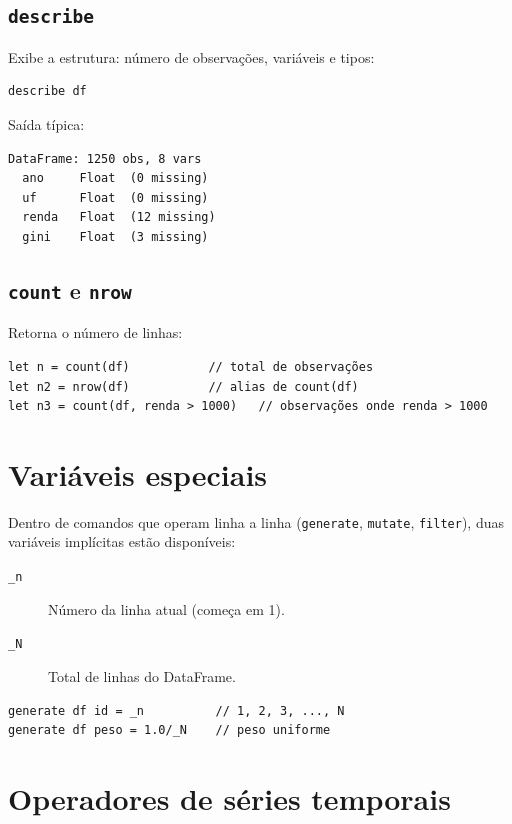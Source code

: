 \subsection*{\texttt{describe}}

Exibe a estrutura: número de observações, variáveis e tipos:

\begin{lstlisting}
describe df
\end{lstlisting}

Saída típica:

\begin{lstlisting}[style=inline]
DataFrame: 1250 obs, 8 vars
  ano     Float  (0 missing)
  uf      Float  (0 missing)
  renda   Float  (12 missing)
  gini    Float  (3 missing)
\end{lstlisting}

\subsection*{\texttt{count} e \texttt{nrow}}

Retorna o número de linhas:

\begin{lstlisting}
let n = count(df)           // total de observações
let n2 = nrow(df)           // alias de count(df)
let n3 = count(df, renda > 1000)   // observações onde renda > 1000
\end{lstlisting}

\section{Variáveis especiais}

Dentro de comandos que operam linha a linha (\lstinline{generate}, \lstinline{mutate},
\lstinline{filter}), duas variáveis implícitas estão disponíveis:

\begin{description}
  \item[\lstinline{_n}] Número da linha atual (começa em 1).
  \item[\lstinline{_N}] Total de linhas do DataFrame.
\end{description}

\begin{lstlisting}
generate df id = _n          // 1, 2, 3, ..., N
generate df peso = 1.0/_N    // peso uniforme
\end{lstlisting}

\section{Operadores de séries temporais}

